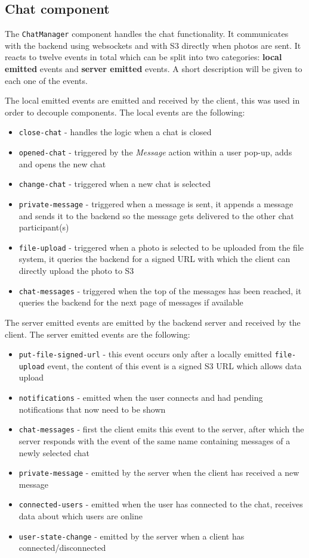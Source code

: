 \subsection{Chat component}

The \verb|ChatManager| component handles the chat functionality. It communicates with the backend using websockets and with S3 directly when photos are sent. It reacts to twelve events in total which can be split into two categories: \textbf{local emitted} events and \textbf{server emitted} events. A short description will be given to each one of the events.

The local emitted events are emitted and received by the client, this was used in order to decouple components. The local events are the following: 
\begin{itemize}
	\item \verb|close-chat| - handles the logic when a chat is closed
	\item \verb|opened-chat| - triggered by the \textit{Message} action within a user pop-up, adds and opens the new chat
	\item \verb|change-chat| - triggered when a new chat is selected
	\item \verb|private-message| - triggered when a message is sent, it appends a message and sends it to the backend so the message gets delivered to the other chat participant(s)
	\item \verb|file-upload| - triggered when a photo is selected to be uploaded from the file system, it queries the backend for a signed URL with which the client can directly upload the photo to S3
	\item \verb|chat-messages| - triggered when the top of the messages has been reached, it queries the backend for the next page of messages if available
\end{itemize}

The server emitted events are emitted by the backend server and received by the client. The server emitted events are the following:
\begin{itemize}
	\item \verb|put-file-signed-url| - this event occurs only after a locally emitted \verb|file-upload| event, the content of this event is a signed S3 URL which allows data upload
	\item \verb|notifications| - emitted when the user connects and had pending notifications that now need to be shown
	\item \verb|chat-messages| - first the client emits this event to the server, after which the server responds with the event of the same name containing messages of a newly selected chat
	\item \verb|private-message| - emitted by the server when the client has received a new message
	\item \verb|connected-users| - emitted when the user has connected to the chat, receives data about which users are online
	\item \verb|user-state-change| - emitted by the server when a client has connected/disconnected
\end{itemize}

